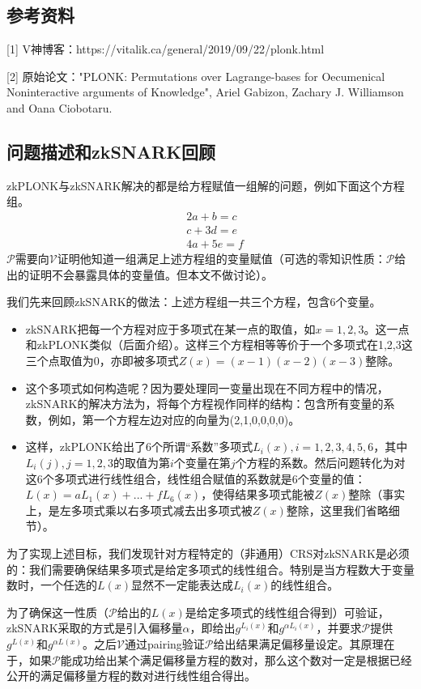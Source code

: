 \documentclass[12pt]{article}
\newcommand{\zk}{zkPLONK}
\newcommand{\pp}{$\mathcal{P}$}
\newcommand{\vv}{$\mathcal{V}$}
\begin{document}
\subsection{参考资料}
[1] V神博客：https://vitalik.ca/general/2019/09/22/plonk.html

[2] 原始论文："PLONK: Permutations over Lagrange-bases for Oecumenical Noninteractive arguments of Knowledge", Ariel Gabizon, Zachary J. Williamson and Oana Ciobotaru.
\subsection{问题描述和zkSNARK回顾}
\zk 与zkSNARK解决的都是给方程赋值一组解的问题，例如下面这个方程组。
\begin{align*}
	&2a+b=c \\
	&c+3d=e \\
	&4a+5e=f 
\end{align*}
\pp 需要向\vv 证明他知道一组满足上述方程组的变量赋值（可选的零知识性质：\pp 给出的证明不会暴露具体的变量值。但本文不做讨论）。

我们先来回顾zkSNARK的做法：上述方程组一共三个方程，包含6个变量。

\begin{itemize}
\item zkSNARK把每一个方程对应于多项式在某一点的取值，如$x=1,2,3$。这一点和\zk 类似（后面介绍）。这样三个方程相等等价于一个多项式在1,2,3这三个点取值为0，亦即被多项式$Z(x)=(x-1)(x-2)(x-3)$整除。
\item 这个多项式如何构造呢？因为要处理同一变量出现在不同方程中的情况，zkSNARK的解决方法为，将每个方程视作同样的结构：包含所有变量的系数，例如，第一个方程左边对应的向量为(2,1,0,0,0,0)。
\item 这样，\zk 给出了6个所谓“系数”多项式$L_i(x),i=1,2,3,4,5,6$，其中$L_i(j),j=1,2,3$的取值为第$i$个变量在第$j$个方程的系数。然后问题转化为对这6个多项式进行线性组合，线性组合赋值的系数就是6个变量的值：$L(x)=aL_1(x)+...+fL_6(x)$，使得结果多项式能被$Z(x)$整除（事实上，是左多项式乘以右多项式减去出多项式被$Z(x)$整除，这里我们省略细节）。
\end{itemize}
为了实现上述目标，我们发现针对方程特定的（非通用）CRS对zkSNARK是必须的：我们需要确保结果多项式是给定多项式的线性组合。特别是当方程数大于变量数时，一个任选的$L(x)$显然不一定能表达成$L_i(x)$的线性组合。

为了确保这一性质（\pp 给出的$L(x)$是给定多项式的线性组合得到）可验证，zkSNARK采取的方式是引入偏移量$\alpha$，即给出$g^{L_i(x)}$和$g^{\alpha L_i(x)}$，并要求\pp 提供$g^{L(x)}$和$g^{\alpha L(x)}$。之后\vv 通过pairing验证\pp 给出结果满足偏移量设定。其原理在于，如果\pp 能成功给出某个满足偏移量方程的数对，那么这个数对一定是根据已经公开的满足偏移量方程的数对进行线性组合得出。
\end{document}
